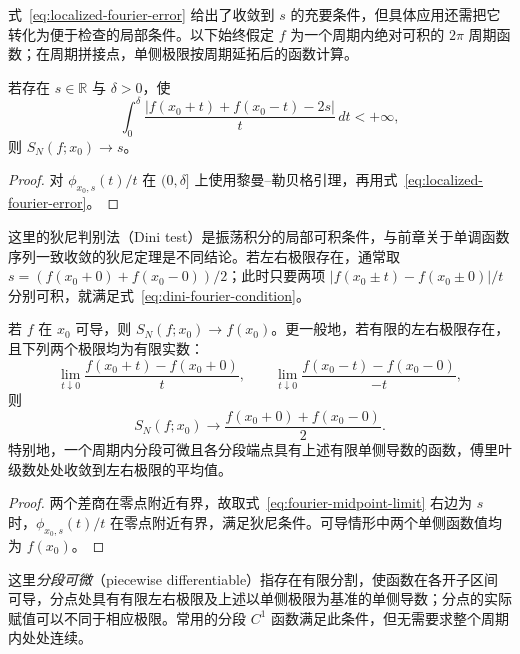 \documentclass[UTF8,12pt,a4paper,fontset=fandol]{ctexbook}
\begin{document}
式~\eqref{eq:localized-fourier-error} 给出了收敛到 $s$ 的充要条件，但具体应用还需把它转化为便于检查的局部条件。以下始终假定 $f$ 为一个周期内绝对可积的 $2\pi$ 周期函数；在周期拼接点，单侧极限按周期延拓后的函数计算。

\begin{theorem}[傅里叶级数的狄尼判别法]
\label{thm:dini-fourier-convergence}
若存在 $s\in\mathbb R$ 与 $\delta>0$，使
\begin{equation}
    \int_0^\delta
       \frac{|f(x_0+t)+f(x_0-t)-2s|}{t}\,dt<+\infty,
    \label{eq:dini-fourier-condition}
\end{equation}
则 $S_N(f;x_0)\to s$。
\end{theorem}

\begin{proof}
对 $\phi_{x_0,s}(t)/t$ 在 $(0,\delta]$ 上使用黎曼--勒贝格引理，再用式~\eqref{eq:localized-fourier-error}。
\end{proof}

这里的狄尼判别法（Dini test）是振荡积分的局部可积条件，与前章关于单调函数序列一致收敛的狄尼定理是不同结论。若左右极限存在，通常取 $s=(f(x_0+0)+f(x_0-0))/2$；此时只要两项 $|f(x_0\pm t)-f(x_0\pm0)|/t$ 分别可积，就满足式~\eqref{eq:dini-fourier-condition}。

\begin{corollary}[可导情形与分段可微情形]
\label{cor:piecewise-differentiable-fourier-convergence}
若 $f$ 在 $x_0$ 可导，则 $S_N(f;x_0)\to f(x_0)$。更一般地，若有限的左右极限存在，且下列两个极限均为有限实数：
\[
    \lim_{t\downarrow0}\frac{f(x_0+t)-f(x_0+0)}t,
    \qquad
    \lim_{t\downarrow0}\frac{f(x_0-t)-f(x_0-0)}{-t},
\]
则
\begin{equation}
    S_N(f;x_0)\longrightarrow
          \frac{f(x_0+0)+f(x_0-0)}2.
    \label{eq:fourier-midpoint-limit}
\end{equation}
特别地，一个周期内分段可微且各分段端点具有上述有限单侧导数的函数，傅里叶级数处处收敛到左右极限的平均值。
\end{corollary}

\begin{proof}
两个差商在零点附近有界，故取式~\eqref{eq:fourier-midpoint-limit} 右边为 $s$ 时，$\phi_{x_0,s}(t)/t$ 在零点附近有界，满足狄尼条件。可导情形中两个单侧函数值均为 $f(x_0)$。
\end{proof}

这里\emph{分段可微}（piecewise differentiable）指存在有限分割，使函数在各开子区间可导，分点处具有有限左右极限及上述以单侧极限为基准的单侧导数；分点的实际赋值可以不同于相应极限。常用的分段 $C^1$ 函数满足此条件，但无需要求整个周期内处处连续。
\end{document}

